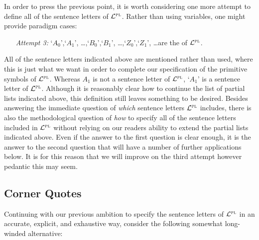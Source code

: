 In order to press the previous point, it is worth considering one more attempt to define all of the sentence letters of $\mathcal{L}^{\textsc{pl}}$.
Rather than using variables, one might provide paradigm cases:

\begin{enumerate}[leftmargin=1.25in, itemsep=-.4em]
  \item[\it Attempt 3:] `$A_0$',`$A_1$', \ldots,`$B_0$',`$B_1$', \ldots,`$Z_0$',`$Z_1$', \ldots are the  of $\mathcal{L}^{\textsc{pl}}$.
\end{enumerate}

All of the sentence letters indicated above are mentioned rather than used, where this is just what we want in order to complete our specification of the primitive symbols of $\mathcal{L}^{\textsc{pl}}$.
Whereas $A_1$ is not a sentence letter of $\mathcal{L}^{\textsc{pl}}$, `$A_1$' is a sentence letter of $\mathcal{L}^{\textsc{pl}}$. 
Although it is reasonably clear how to continue the list of partial lists indicated above, this definition still leaves something to be desired.
Besides answering the immediate question of \textit{which} sentence letters $\mathcal{L}^{\textsc{pl}}$ includes, there is also the methodological question of \textit{how} to specify all of the sentence letters included in $\mathcal{L}^{\textsc{pl}}$ without relying on our readers ability to extend the partial lists indicated above. 
Even if the answer to the first question is clear enough, it is the answer to the second question that will have a number of further applications below.
It is for this reason that we will improve on the third attempt however pedantic this may seem. %




\subsection{Corner Quotes}%
  \label{sub.corner-quotes}


Continuing with our previous ambition to specify the sentence letters of $\mathcal{L}^{\textsc{pl}}$ in an accurate, explicit, and exhaustive way, consider the following somewhat long-winded alternative:

